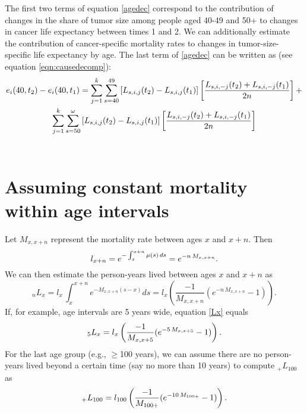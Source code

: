 \documentclass[12pt,letterpaper]{article}
\theoremstyle{plain}
\begin{document}
The first two terms of equation \eqref{agedec} correspond to the contribution of changes in the share of tumor size among people aged 40-49 and 50+ to changes in cancer life expectancy between times 1 and 2. We can additionally estimate the contribution of cancer-specific mortality rates to changes in tumor-size-specific life expectancy by age. The last term of \eqref{agedec} can be written as (see equation \eqref{eqn:causedecomp}):
\begin{multline}
e_i(40,t_2)-e_i(40,t_1)=\sum_{j=1}^{k} \sum_{s=40}^{49}\left[L_{s,i,j}(t_2)-L_{s,i,j}(t_1) \right] \left[\frac{L_{s,i,-j}(t_2)+L_{s,i,-j}(t_1) }{2n} \right] + \\
\sum_{j=1}^{k} \sum_{s=50}^{\omega}\left[L_{s,i,j}(t_2)-L_{s,i,j}(t_1) \right] \left[\frac{L_{s,i,-j}(t_2)+L_{s,i,-j}(t_1) }{2n} \right] \notag
\end{multline}\\

\section*{Assuming constant mortality within age intervals}
Let $M_{x,x+n}$ represent the mortality rate between ages $x$ and $x+n$. Then 
\begin{equation}
l_{x+n}=e^{-\int_x^{x+n}\mu(s)\,ds}=e^{-n\,M_{x,x+n}}.\notag
\end{equation}
We can then estimate the person-years lived between ages $x$ and $x+n$ as
\begin{equation}
_nL_{x}=l_x\,\int_x^{x+n} e^{-M_{x,x+n}(s-x)} ds=l_x \left(\frac{-1}{M_{x,x+n}}(e^{-n\,M_{x,x+n}}-1) \right).
\label{Lx}
\end{equation}
If, for example, age intervals are 5 years wide, equation \eqref{Lx} equals
\begin{equation}
_5L_{x}=l_x \left(\frac{-1}{M_{x,x+5}}(e^{-5\,M_{x,x+5}}-1) \right).\notag
\end{equation}
For the last age group (e.g., $\geq$100 years), we can assume there
are no person-years lived beyond a certain time (say no more than 10 years) to compute $_+L_{100}$ as
\begin{equation}
_+L_{100}=l_{100} \left(\frac{-1}{M_{100+}}(e^{-10\,M_{100+}}-1) \right).\notag
\end{equation}

\end{document}
